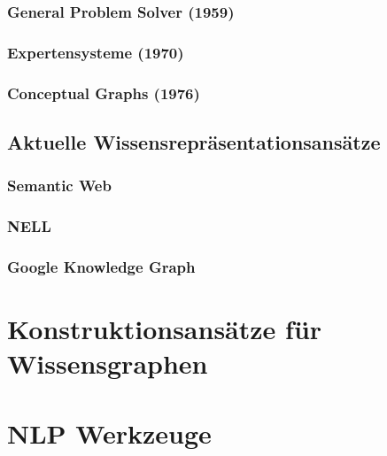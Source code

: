 \subsubsection{General Problem Solver (1959)}
\label{sec:related:kr:history:gps}

\subsubsection{Expertensysteme (1970)}
\label{sec:related:kr:history:expert}

\subsubsection{Conceptual Graphs (1976)}
\label{sec:related:kr:history:cg}

\subsection{Aktuelle Wissensrepräsentationsansätze}
\label{sec:related:kr:today}

\subsubsection{Semantic Web}
\label{sec:related:kr:today:sw}

\subsubsection{NELL}
\label{sec:related:kr:today:nell}

\subsubsection{Google Knowledge Graph}
\label{sec:related:kr:today:google-kg}

\section{Konstruktionsansätze für Wissensgraphen}
\label{sec:related:kbc}

\section{NLP Werkzeuge}
\label{sec:related:nlp}
